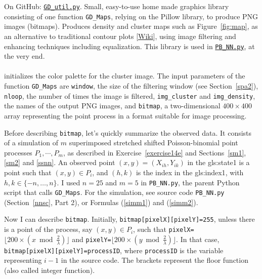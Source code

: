 \documentclass[10pt]{article}
\begin{document}
{On GitHub}: \href{https://github.com/VincentGranville/Point-Processes/blob/main/Source\%20Code/GD_util.py}{\texttt{GD\_util.py}}. Small, easy-to-use home made graphics library
consisting of one function \texttt{GD\_Maps}, relying on the Pillow library, to produce PNG images (bitmaps). Produces
density and cluster maps such as Figure~\ref{fig:map}, as an alternative to traditional contour plots [\href{https://scipython.com/book/chapter-7-matplotlib/examples/a-simple-contour-plot/}{Wiki}], using image filtering and enhancing techniques including
equalization. This library is used in
 \href{https://github.com/VincentGranville/Point-Processes/blob/main/Source\%20Code/PB_NN.py}{\texttt{PB\_NN.py}}, at the very end. \\
\quad \\
 initializes the color palette for the cluster image. The input parameters of the function \texttt{GD\_Maps} are
 \texttt{window}, the size of the filtering window (see Section~\ref{spa2}), \texttt{nloop}, the number of times the image is filtered,
\texttt{img\_cluster} and \texttt{img\_density}, the names of the output PNG images, and \texttt{bitmap}, a two-dimensional $400\times 400$
array representing the point process in a format suitable for image processing.

Before describing \texttt{bitmap},
let's quickly summarize the observed data. It consists of a simulation of $m$ superimposed stretched shifted Poisson-binomial point processes  $P_1,\cdots,P_m$, as described in Exercise~\ref{exercise14e} and Sections~\ref{sm1}, \ref{sm2} and \ref{ssnn}. An observed point $(x,y)=(X_{ih}, Y_{ik})$
in the \gls{gls:state1}   is a point such that
$(x,y)\in P_i$, and $(h, k)$ is the \textcolor{index}{index}
in the \gls{gls:index1}, with $h,k\in\{-n,\dots,n\}$. I used $n=25$ and $m=5$ in \texttt{PB\_NN.py}, the parent Python script that calls \texttt{GD\_Maps}.  For the simulation, see source code \texttt{PB\_NN.py} (Section~\ref{nnsc}, Part 2), or Formulas (\ref{simm1}) and (\ref{simm2}).

Now I can describe \texttt{bitmap}.  Initially, \texttt{bitmap[pixelX][pixelY]=255}, unless there is a point of the process,
 say $(x,y)\in P_i$,  such that  \texttt{pixelX=}$\lfloor 200 \times (x \bmod \frac{2}{\lambda}) \rfloor$  and
\texttt{pixelY=}$\lfloor 200 \times (y \bmod \frac{2}{\lambda}) \rfloor$.
In that case, \texttt{bitmap[pixelX][pixelY]=processID}, where \texttt{processID} is the variable representing $i-1$  in the
source code. The brackets represent the floor function (also called integer function).
\end{document}
